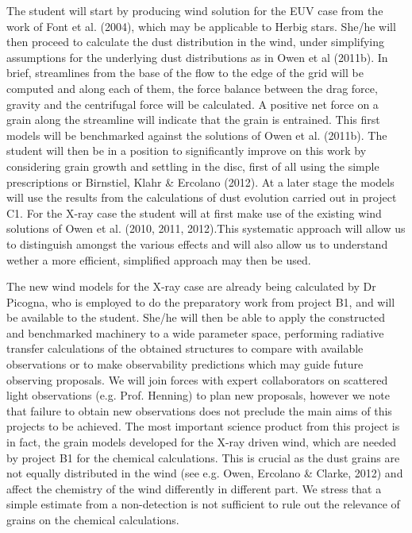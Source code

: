 The student will start by producing wind solution for the EUV case
from the work of Font et al. (2004), which may be applicable to Herbig
stars. She/he will then proceed to calculate the dust distribution in
the wind, under simplifying assumptions for the underlying dust
distributions as in Owen et al (2011b). In brief, streamlines from the
base of the flow to the edge of the grid will be computed and along
each of them, the force balance between the drag force, gravity and
the centrifugal force will be calculated. A positive net force on a
grain along the streamline will indicate that the grain is
entrained. This first models will be benchmarked against the solutions
of Owen et al. (2011b). The student will then be in a position to
significantly improve on this work by considering grain growth and
settling in the disc, first of all using the simple prescriptions or Birnstiel,
Klahr \& Ercolano (2012). At a later stage the models will use the
results from the calculations of dust evolution carried out in project
C1. For the X-ray case the student will at first make use of the
existing wind solutions of Owen et al. (2010, 2011, 2012).This
systematic approach will allow us to distinguish amongst the various
effects and will also allow us to understand wether a more efficient,
simplified approach may then be used. 

The new wind models for the X-ray case are already being calculated by
Dr Picogna, who is employed to do the preparatory work from project B1,
and will be available to the student.  She/he will then be able to
apply the constructed and benchmarked machinery to a wide parameter
space, performing radiative transfer calculations of the obtained
structures to compare with available observations or to make
observability predictions which may guide future observing
proposals. We will join forces with expert collaborators on scattered light
observations (e.g. Prof. Henning) to plan new proposals, however we note
that failure to obtain new observations does not preclude the main
aims of this projects to be achieved. The most important science
product from this project is in fact, the grain models developed for the 
X-ray driven wind, which are needed by project B1 for the chemical
calculations. This is crucial as the dust grains are not equally
distributed in the wind (see e.g. Owen, Ercolano \& Clarke, 2012) and affect the chemistry of the wind
differently in different part. We stress that a simple estimate from a
non-detection is not sufficient to rule out the relevance of grains on
the chemical calculations. 
\noindent 

